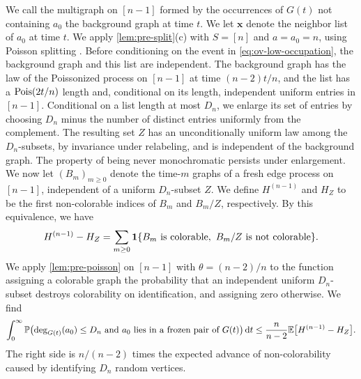 We call the multigraph on $[n - 1]$ formed by the occurrences of $G(t)$ not containing $a_0$ the background graph at time $t$. We let $\mathbf x$ denote the neighbor list of $a_0$ at time $t$. We apply \cref{lem:pre-split}(c) with $S = [n]$ and $a = a_0 = n$, using Poisson splitting \cite[Theorems~5.2 and~5.8]{last2018lectures}. Before conditioning on the event in \eqref{eq:ov-low-occupation}, the background graph and this list are independent. The background graph has the law of the Poissonized process on $[n - 1]$ at time $(n - 2)t/n$, and the list has a $\operatorname{Pois}(2t/n)$ length and, conditional on its length, independent uniform entries in $[n - 1]$. Conditional on a list length at most $D_n$, we enlarge its set of entries by choosing $D_n$ minus the number of distinct entries uniformly from the complement. The resulting set $Z$ has an unconditionally uniform law among the $D_n$-subsets, by invariance under relabeling, and is independent of the background graph. The property of being never monochromatic persists under enlargement. We now let $(B_m)_{m \ge 0}$ denote the time-$m$ graphs of a fresh edge process on $[n - 1]$, independent of a uniform $D_n$-subset $Z$. We define $H^{(n - 1)}$ and $H_Z$ to be the first non-colorable indices of $B_m$ and $B_m/Z$, respectively. By this equivalence, we have
\[
H^{(n - 1)} - H_Z = \sum_{m \ge 0}\mathbf 1\{B_m\text{ is colorable}, \ B_m/Z\text{ is not colorable}\}.
\]
We apply \cref{lem:pre-poisson} on $[n - 1]$ with $\theta = (n - 2)/n$ to the function assigning a colorable graph the probability that an independent uniform $D_n$-subset destroys colorability on identification, and assigning zero otherwise. We find
\begin{equation}\label{eq:ov-to-identify}
\int_0^\infty \mathbb P\bigl(\deg_{G(t)}(a_0) \le D_n \text{ and } a_0 \text{ lies in a frozen pair of } G(t)\bigr) \,\mathrm d t \le \frac{n}{n - 2} \mathbb E\bigl[H^{(n - 1)} - H_Z\bigr].
\end{equation}
The right side is $n/(n - 2)$ times the expected advance of non-colorability caused by identifying $D_n$ random vertices.

